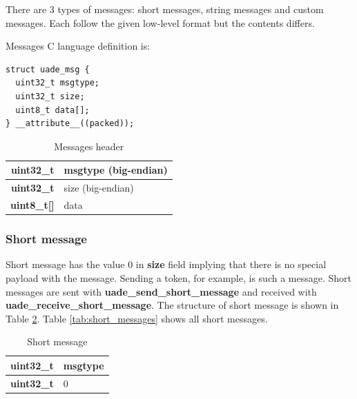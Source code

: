 \documentclass{article}
\begin{document}
There are 3 types of messages: short messages, string messages and custom
messages. Each follow the given low-level format but the contents differs.

Messages C language definition is:
\begin{verbatim}
struct uade_msg {
  uint32_t msgtype;
  uint32_t size;
  uint8_t data[];
} __attribute__((packed));
\end{verbatim}


\begin{table}
\begin{center}
\caption{Messages header}
\label{tab:message_header}
\begin{tabular}{|r|l|}
\hline
\textbf{uint32\_t} & msgtype (big-endian) \\
\hline
\textbf{uint32\_t} & size (big-endian)\\
\hline
\textbf{uint8\_t[]} & data \\
\hline
\end{tabular}
\end{center}
\end{table}

\subsubsection{Short message}

Short message has the value $0$ in \textbf{size} field implying that there is
no special payload with the message. Sending a token, for example, is such
a message. Short messages are sent with \textbf{uade\_send\_short\_message}
and received with \textbf{uade\_receive\_short\_message}. The structure
of short message is shown in Table \ref{tab:short_message}.
Table \ref{tab:short_messages} shows all short messages.

\begin{table}
\begin{center}
\caption{Short message}
\label{tab:short_message}
\begin{tabular}{|r|l|}
\hline
\textbf{uint32\_t} & msgtype\\
\hline
\textbf{uint32\_t} & 0 \\
\hline
\end{tabular}
\end{center}
\end{table}
\end{document}
